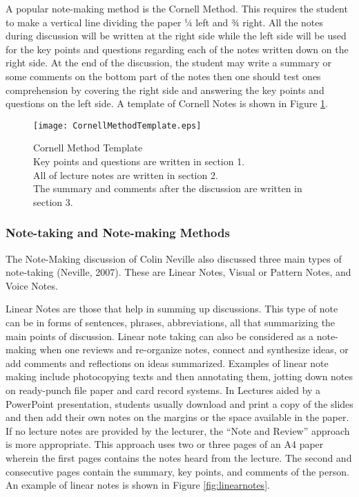 A popular note-making method is the Cornell Method. This requires the student to make a vertical line dividing the paper ¼ left and ¾ right. All the notes during discussion will be written at the right side while the left side will be used for the key points and questions regarding each of the notes written down on the right side. At the end of the discussion, the student may write a summary or some comments on the bottom part of the notes then one should test ones comprehension by covering the right side and answering the key points and questions on the left side. A template of Cornell Notes is shown in Figure \ref{fig:cornellnotes}.

\pagebreak

\begin{figure}[htbp!]
   \centering        
   \texttt{[image: CornellMethodTemplate.eps]}
   \caption{Cornell Method Template \\Key points and questions are written in section 1. \\All of lecture notes are written in section 2. \\The summary and comments after the discussion are written in section 3. }
   \label{fig:cornellnotes}
\end{figure}


\subsubsection{Note-taking and Note-making Methods}

The Note-Making discussion of Colin Neville also discussed three main types of note-taking (Neville, 2007). These are Linear Notes, Visual or Pattern Notes, and Voice Notes.

Linear Notes are those that help in summing up discussions. This type of note can be in forms of sentences, phrases, abbreviations, all that summarizing the main points of discussion. Linear note taking can also be considered as a note-making when one reviews and re-organize notes, connect and synthesize ideas, or add comments and reflections on ideas summarized. Examples of linear note making include photocopying texts and then annotating them, jotting down notes on ready-punch file paper and card record systems. In Lectures aided by a PowerPoint presentation, students usually download and print a copy of the slides and then add their own notes on the margins or the space available in the paper. If no lecture notes are provided by the lecturer, the ``Note and Review'' approach is more appropriate. This approach uses two or three pages of an A4 paper wherein the first pages contains the notes heard from the lecture. The second and consecutive pages contain the summary, key points, and comments of the person. An example of linear notes is shown in Figure \ref{fig:linearnotes}.

